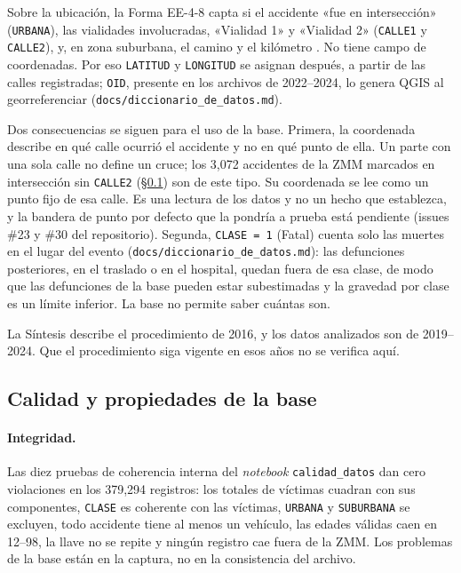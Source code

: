 Sobre la ubicación, la Forma EE-4-8 capta si el accidente «fue en intersección»
(\texttt{URBANA}), las vialidades involucradas, «Vialidad 1» y «Vialidad 2»
(\texttt{CALLE1} y \texttt{CALLE2}), y, en zona suburbana, el camino y el
kilómetro \parencite{inegi_sintesis2016}. No tiene campo de coordenadas. Por eso
\texttt{LATITUD} y \texttt{LONGITUD} se asignan después, a partir de las calles
registradas; \texttt{OID}, presente en los archivos de 2022--2024, lo genera QGIS
al georreferenciar (\texttt{docs/diccionario\_de\_datos.md}).

Dos consecuencias se siguen para el uso de la base. Primera, la coordenada
describe en qué calle ocurrió el accidente y no en qué punto de ella. Un parte
con una sola calle no define un cruce; los 3,072 accidentes de la ZMM marcados en
intersección sin \texttt{CALLE2} (§\ref{sec:datos-calidad}) son de este tipo. Su
coordenada se lee como un punto fijo de esa calle. Es una lectura de los datos y
no un hecho que \textcite{inegi_sintesis2016} establezca, y la bandera de punto
por defecto que la pondría a prueba está pendiente (issues \#23 y \#30 del
repositorio). Segunda, \texttt{CLASE = 1} (Fatal) cuenta solo las muertes en el
lugar del evento (\texttt{docs/diccionario\_de\_datos.md}): las defunciones
posteriores, en el traslado o en el hospital, quedan fuera de esa clase, de modo
que las defunciones de la base pueden estar subestimadas y la gravedad por clase
es un límite inferior. La base no permite saber cuántas son.

La Síntesis describe el procedimiento de 2016, y los datos analizados son de
2019--2024. Que el procedimiento siga vigente en esos años no se verifica aquí.

\subsection{Calidad y propiedades de la base}\label{sec:datos-calidad}

\paragraph{Integridad.} Las diez pruebas de coherencia interna del
\emph{notebook} \texttt{calidad\_datos} dan cero violaciones en los 379,294
registros: los totales de víctimas cuadran con sus componentes, \texttt{CLASE} es
coherente con las víctimas, \texttt{URBANA} y \texttt{SUBURBANA} se excluyen, todo
accidente tiene al menos un vehículo, las edades válidas caen en 12--98, la llave
no se repite y ningún registro cae fuera de la ZMM. Los problemas de la base
están en la captura, no en la consistencia del archivo.

